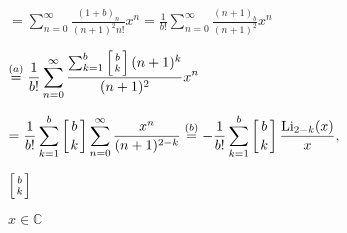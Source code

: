 \documentclass{article}
\def\lthtmlcheckvsize{\ifdim\ht\sizebox<\vsize 
  \ifdim\wd\sizebox<\hsize\expandafter\hfill\fi \expandafter\vfill
  \else\expandafter\vss\fi}%
\begin{document}
{\newpage\clearpage
{}%
$\displaystyle =\sum^{\infty}_{n=0}\frac{(1+b)_n}{(n+1)^2n!}x^n = \frac{1}{b!}\sum^{\infty}_{n=0} \frac{(n+1)_{b}}{(n+1)^2}x^n \nonumber$%
\lthtmlindisplaymathZ
\lthtmlcheckvsize\clearpage}

{\newpage\clearpage
{}%
$\displaystyle \overset{(a)}{=} \frac{1}{b!} \sum^{\infty}_{n=0} \frac{\sum^{b}_{k=1}\left[ b \atop k \right](n+1)^k}{(n+1)^2} x^n\nonumber$%
\lthtmlindisplaymathZ
\lthtmlcheckvsize\clearpage}

{\newpage\clearpage
{}%
$\displaystyle = \frac{1}{b!} \sum^{b}_{k=1}\left[ b \atop k \right] \sum^{\infty}_{n=0}  \frac{x^n}{(n+1)^{2-k}} \overset{(b)}{=} -\frac{1}{b!}\sum^{b}_{k=1} \left[ b \atop k \right]\frac{\text{Li}_{2-k}(x)}{x},$%
\lthtmlindisplaymathZ
\lthtmlcheckvsize\clearpage}

{\newpage\clearpage
{}%
$ \left[ b \atop k \right]$%
\lthtmlindisplaymathZ
\lthtmlcheckvsize\clearpage}

{\newpage\clearpage
{}%
$ x \in \mathbb{C}$%
\lthtmlindisplaymathZ
\lthtmlcheckvsize\clearpage}
\end{document}
